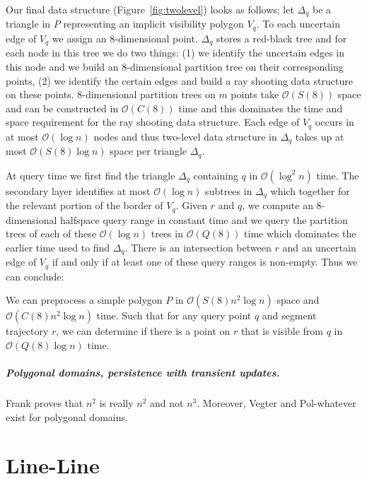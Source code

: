 \documentclass[a4paper, UKenglish]{lipics-v2018}
\begin{document}
Our final data structure (Figure~\ref{fig:twolevel}) looks as follows: let $\Delta_q$ be a triangle in $P$ representing an implicit visibility polygon $V_q$. To each uncertain edge of $V_q$ we assign an $8$-dimensional point. $\Delta_q$ stores a red-black tree and for each node in this tree we do two things: (1) we identify the uncertain edges in this node and we build an $8$-dimensional partition tree on their corresponding points, (2) we identify the certain edges and build a ray shooting data structure on these points.
$8$-dimensional partition trees on $m$ points take $\mathcal{O}(S(8))$ space and can be constructed in $\mathcal{O}(C(8))$ time and this dominates the time and space requirement for the ray shooting data structure. Each edge of $V_q$ occurs in at most $\mathcal{O}(\log n)$ nodes and thus two-level data structure in $\Delta_q$ takes up at most $\mathcal{O}(S(8) \log n)$ space per triangle $\Delta_q$.

At query time we first find the triangle $\Delta_q$ containing $q$ in $\mathcal{O}(\log^2 n)$ time. The secondary layer identifies at most $\mathcal{O}(\log n)$ subtrees in $\Delta_q$ which together for the relevant portion of the border of $V_q$. Given $r$ and $q$, we compute an $8$-dimensional halfspace query range in constant time and we query the partition trees of each of these $\mathcal{O}(\log n)$ trees in $\mathcal{O}(Q(8))$ time which dominates the earlier time used to find $\Delta_q$. There is an intersection between $r$ and an uncertain edge of $V_q$ if and only if at least one of these query ranges is non-empty.  Thus we can conclude:

\begin{theorem}
We can preprocess a simple polygon $P$ in $\mathcal{O}(S(8) n^2 \log n)$ space and \\ $\mathcal{O}(C(8) n^2 \log n)$ time. Such that for any query point $q$ and segment trajectory $r$, we can determine if there is a point on $r$ that is visible from $q$ in $\mathcal{O}(Q(8) \log n)$ time.
\end{theorem}




\subparagraph{Polygonal domains, persistence with transient updates.}

Frank proves that $n^2$ is really $n^2$ and not $n^3$. Moreover, Vegter and Pol-whatever exist for polygonal domains.


\section{Line-Line}
\label{sec:lineline}
\end{document}
